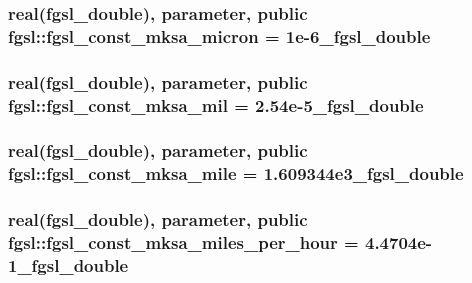 \subsubsection[{fgsl\+\_\+const\+\_\+mksa\+\_\+micron}]{\setlength{\rightskip}{0pt plus 5cm}real({\bf fgsl\+\_\+double}), parameter, public fgsl\+::fgsl\+\_\+const\+\_\+mksa\+\_\+micron = 1e-\/6\+\_\+fgsl\+\_\+double}\label{namespacefgsl_ab0be2229dca10e5128f21a8729ff742b}
\hypertarget{namespacefgsl_af6a9d8baf161c3f9b2b9c8ef41833a67}{}
\subsubsection[{fgsl\+\_\+const\+\_\+mksa\+\_\+mil}]{\setlength{\rightskip}{0pt plus 5cm}real({\bf fgsl\+\_\+double}), parameter, public fgsl\+::fgsl\+\_\+const\+\_\+mksa\+\_\+mil = 2.\+54e-\/5\+\_\+fgsl\+\_\+double}\label{namespacefgsl_af6a9d8baf161c3f9b2b9c8ef41833a67}
\hypertarget{namespacefgsl_a6336ad4316ac012f6ae1ba2c951ec520}{}
\subsubsection[{fgsl\+\_\+const\+\_\+mksa\+\_\+mile}]{\setlength{\rightskip}{0pt plus 5cm}real({\bf fgsl\+\_\+double}), parameter, public fgsl\+::fgsl\+\_\+const\+\_\+mksa\+\_\+mile = 1.\+609344e3\+\_\+fgsl\+\_\+double}\label{namespacefgsl_a6336ad4316ac012f6ae1ba2c951ec520}
\hypertarget{namespacefgsl_a66a4e29fec2be328384363b6a5b3efcd}{}
\subsubsection[{fgsl\+\_\+const\+\_\+mksa\+\_\+miles\+\_\+per\+\_\+hour}]{\setlength{\rightskip}{0pt plus 5cm}real({\bf fgsl\+\_\+double}), parameter, public fgsl\+::fgsl\+\_\+const\+\_\+mksa\+\_\+miles\+\_\+per\+\_\+hour = 4.\+4704e-\/1\+\_\+fgsl\+\_\+double}\label{namespacefgsl_a66a4e29fec2be328384363b6a5b3efcd}
\hypertarget{namespacefgsl_a5c0cc4ab0dc2be570d83ef0f9d2f4ba6}{}
